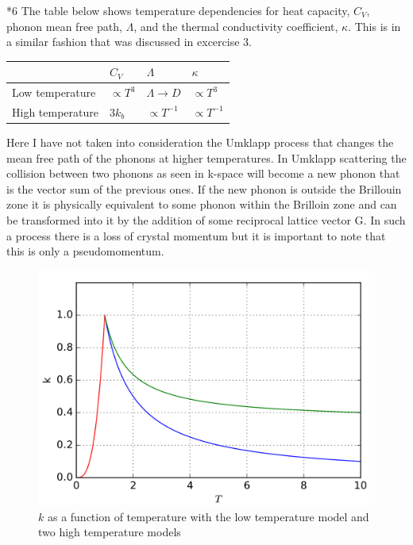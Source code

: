 \documentclass[a4paper]{article}
\begin{document}
\begin{section}
\begin{section}*6
	The table below shows temperature dependencies for heat capacity, $C_V$, phonon mean free path, $\Lambda$, and the thermal conductivity coefficient, $\kappa$. This is in a similar fashion that was discussed in excercise 3.\newline
	\begin{center}
	\begin{tabular}{ | l | l | l | l | }
		\hline
		 & $C_V$ & $\Lambda$ & $\kappa$ \\ \hline
		Low temperature & $\propto T^3$ & $\Lambda \rightarrow D$ & $\propto T^3$ \\ \hline
		High temperature & $3k_b$ & $\propto T^{-1}$ & $\propto T^{-1}$\\
		\hline
	\end{tabular}
	\end{center}
	Here I have not taken into consideration the Umklapp process that changes the mean free path of the phonons at higher temperatures. In  Umklapp scattering the collision between two phonons as seen in k-space will become a new phonon that is the vector sum of the previous ones. If the new phonon is outside the Brillouin zone it is physically equivalent to some phonon within the Brilloin zone and can be transformed into it by the addition of some reciprocal lattice vector G. In such a process there is a loss of crystal momentum but it is important to note that this is only a pseudomomentum.
	\begin{figure}[H]
		\includegraphics[width = 0.8\linewidth]{kappa.png}
		\centering
		\caption{$k$ as a function of temperature with the low temperature model and two high temperature models}
	\end{figure}
\end{section}

\end{section}
\end{document}
